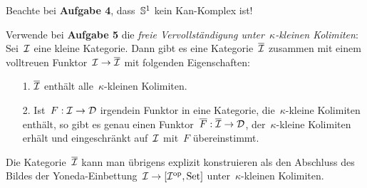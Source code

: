 \documentclass{uebblatt}
\begin{document}
Beachte bei \textbf{Aufgabe 4}, dass~$\mathbb{S}^1$ kein Kan-Komplex ist!

Verwende bei \textbf{Aufgabe 5} die \emph{freie Vervollständigung
unter~$\kappa$-kleinen Kolimiten}: Sei~$\mathcal{I}$ eine kleine Kategorie. Dann gibt es
eine Kategorie~$\overline{\mathcal{I}}$ zusammen mit einem volltreuen Funktor~$\mathcal{I} \to
\overline{\mathcal{I}}$ mit folgenden Eigenschaften:
\begin{enumerate}
\item[1.] $\overline{\mathcal{I}}$ enthält alle~$\kappa$-kleinen Kolimiten.
\item[2.] Ist~$F : \mathcal{I} \to \mathcal{D}$ irgendein Funktor in eine Kategorie,
die~$\kappa$-kleine Kolimiten enthält, so gibt es genau einen
Funktor~$\overline{F} : \overline{\mathcal{I}} \to \mathcal{D}$, der~$\kappa$-kleine Kolimiten
erhält und eingeschränkt auf~$\mathcal{I}$ mit~$F$ übereinstimmt.
\end{enumerate}
Die Kategorie~$\overline{\mathcal{I}}$ kann man übrigens explizit konstruieren als den
Abschluss des Bildes der Yoneda-Einbettung~$\mathcal{I} \to [\mathcal{I}^{\mathrm{op}},\mathrm{Set}]$
unter~$\kappa$-kleinen Kolimiten.
\end{document}
